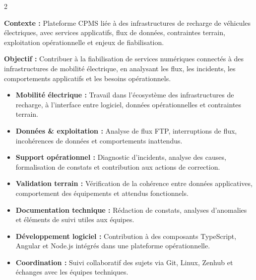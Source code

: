 \documentclass[8pt,a4paper,ragged2e,withhyper]{altacv}
\begin{document}



\makecvheader
\vspace{-0.3cm}


\begin{paracol}{2}



\textbf{Contexte :} Plateforme CPMS liée à des infrastructures de recharge de véhicules électriques, avec services applicatifs, flux de données, contraintes terrain, exploitation opérationnelle et enjeux de fiabilisation.

\textbf{Objectif :} Contribuer à la fiabilisation de services numériques connectés à des infrastructures de mobilité électrique, en analysant les flux, les incidents, les comportements applicatifs et les besoins opérationnels.

\begin{itemize}
  \item \textbf{Mobilité électrique :} Travail dans l’écosystème des infrastructures de recharge, à l’interface entre logiciel, données opérationnelles et contraintes terrain.
  \item \textbf{Données \& exploitation :} Analyse de flux FTP, interruptions de flux, incohérences de données et comportements inattendus.
  \item \textbf{Support opérationnel :} Diagnostic d’incidents, analyse des causes, formalisation de constats et contribution aux actions de correction.
  \item \textbf{Validation terrain :} Vérification de la cohérence entre données applicatives, comportement des équipements et attendus fonctionnels.
  \item \textbf{Documentation technique :} Rédaction de constats, analyses d’anomalies et éléments de suivi utiles aux équipes.
  \item \textbf{Développement logiciel :} Contribution à des composants TypeScript, Angular et Node.js intégrés dans une plateforme opérationnelle.
  \item \textbf{Coordination :} Suivi collaboratif des sujets via Git, Linux, Zenhub et échanges avec les équipes techniques.
\end{itemize}


\end{paracol}
\end{document}
